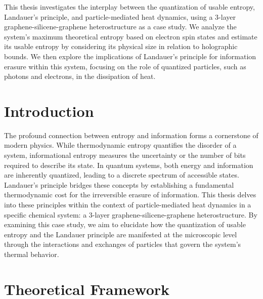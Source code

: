 

















	
	
		This thesis investigates the interplay between the quantization of usable entropy, Landauer's principle, and particle-mediated heat dynamics, using a 3-layer graphene-silicene-graphene heterostructure as a case study. We analyze the system's maximum theoretical entropy based on electron spin states and estimate its usable entropy by considering its physical size in relation to holographic bounds. We then explore the implications of Landauer's principle for information erasure within this system, focusing on the role of quantized particles, such as photons and electrons, in the dissipation of heat.

	
	\section{Introduction}
	The profound connection between entropy and information forms a cornerstone of modern physics. While thermodynamic entropy quantifies the disorder of a system, informational entropy measures the uncertainty or the number of bits required to describe its state. In quantum systems, both energy and information are inherently quantized, leading to a discrete spectrum of accessible states. Landauer's principle bridges these concepts by establishing a fundamental thermodynamic cost for the irreversible erasure of information. This thesis delves into these principles within the context of particle-mediated heat dynamics in a specific chemical system: a 3-layer graphene-silicene-graphene heterostructure. By examining this case study, we aim to elucidate how the quantization of usable entropy and the Landauer principle are manifested at the microscopic level through the interactions and exchanges of particles that govern the system's thermal behavior.
	
	\section{Theoretical Framework}
	
